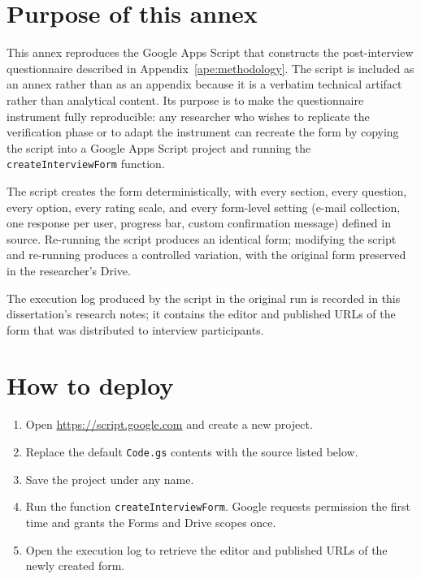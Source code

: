 
\section*{Purpose of this annex}

This annex reproduces the Google Apps Script that constructs the post-interview questionnaire described in Appendix~\ref{ape:methodology}. The script is included as an annex rather than as an appendix because it is a verbatim technical artifact rather than analytical content. Its purpose is to make the questionnaire instrument fully reproducible: any researcher who wishes to replicate the verification phase or to adapt the instrument can recreate the form by copying the script into a Google Apps Script project and running the \texttt{createInterviewForm} function.

The script creates the form deterministically, with every section, every question, every option, every rating scale, and every form-level setting (e-mail collection, one response per user, progress bar, custom confirmation message) defined in source. Re-running the script produces an identical form; modifying the script and re-running produces a controlled variation, with the original form preserved in the researcher's Drive.

The execution log produced by the script in the original run is recorded in this dissertation's research notes; it contains the editor and published URLs of the form that was distributed to interview participants.

\section*{How to deploy}

\begin{enumerate}[itemsep=4pt,topsep=2pt]
  \item Open \url{https://script.google.com} and create a new project.
  \item Replace the default \texttt{Code.gs} contents with the source listed below.
  \item Save the project under any name.
  \item Run the function \texttt{createInterviewForm}. Google requests permission the first time and grants the Forms and Drive scopes once.
  \item Open the execution log to retrieve the editor and published URLs of the newly created form.
\end{enumerate}


